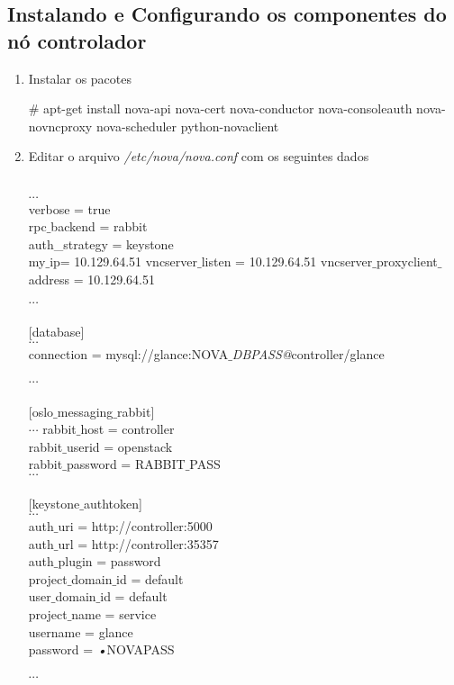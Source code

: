 \subsection{Instalando e Configurando os componentes do nó controlador}
\begin{enumerate}
	\item Instalar os pacotes
	\begin{snugshade}
		\# apt-get install nova-api nova-cert nova-conductor nova-consoleauth nova-novncproxy nova-scheduler python-novaclient
	\end{snugshade}
	
	\item Editar o arquivo \emph{/etc/nova/nova.conf} com os seguintes dados
	\begin{snugshade}
		[default]\\
		$\cdots$\\
		verbose = true\\
		rpc$\_$backend = rabbit	\\
		auth\_strategy = keystone\\
		my$\_$ip= 10.129.64.51
		vncserver$\_$listen = 10.129.64.51
		vncserver$\_$proxyclient$\_$address = 10.129.64.51
		
		$\cdots$\\ \\
		
		[database] \\
		$\cdots$ \\
		connection = mysql://glance:NOVA$\_$\emph{DBPASS@}controller/glance \\ \\
		
		$\cdots$\\ \\
		
		[oslo$\_$messaging$\_$rabbit]\\
		$\cdots$
		rabbit$\_$host = controller \\
		rabbit$\_$userid = openstack \\
		rabbit$\_$password = RABBIT$\_$PASS\\
		
		$\cdots$\\ \\		
		
		[keystone$\_$authtoken] \\
		$\cdots$ \\
		auth$\_$uri = http://controller:5000 \\
		auth$\_$url = http://controller:35357 \\
		auth$\_$plugin = password \\
		project$\_$domain$\_$id = default \\
		user$\_$domain$\_$id = default \\
		project$\_$name = service \\				
		username = glance \\
		password = \emph{•}{NOVAPASS}\\ \\
		$\cdots$ \\ \\
						

\end{snugshade}
\end{enumerate}
